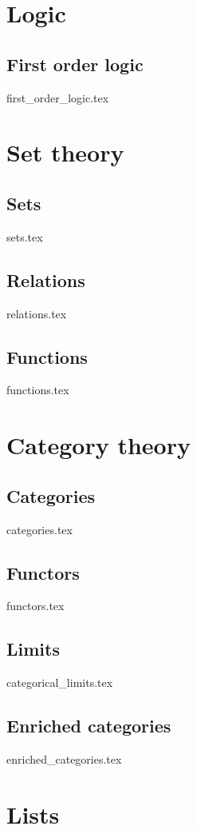 \documentclass[numbers=endperiod, bibliography=totocnumbered]{scrartcl}
\begin{document}
\section{Logic}\label{sec:logic}
\subsection{First order logic}\label{sec:first_order_logic}
{first_order_logic.tex}

\section{Set theory}\label{sec:set_theory}
\subsection{Sets}\label{sec:sets}
{sets.tex}
\subsection{Relations}\label{sec:relations}
{relations.tex}
\subsection{Functions}\label{sec:functions}
{functions.tex}

\section{Category theory}\label{sec:category_theory}
\subsection{Categories}\label{sec:categories}
{categories.tex}
\subsection{Functors}\label{sec:functors}
{functors.tex}
\subsection{Limits}\label{sec:categorical_limits}
{categorical_limits.tex}
\subsection{Enriched categories}\label{sec:enriched_categories}
{enriched_categories.tex}

\section{Lists}

\listofaoc\label{list:aoc}
\listoflem\label{list:lem}
\listofusc\label{list:usc}

\printbibliography
\end{document}
